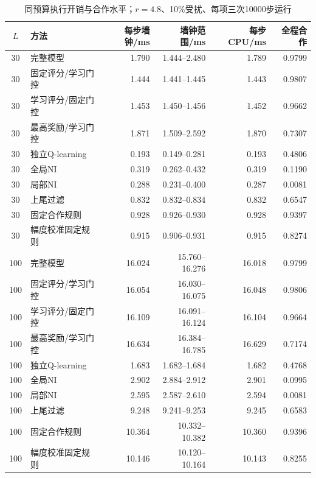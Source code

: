 \begin{table}[!htbp]
\centering\small
\caption{同预算执行开销与合作水平；$r=4.8$、10\%受扰、每项三次10000步运行}
\label{tab:w2-timing}
\begin{tabular}{clrrrr}
\toprule
$L$ & 方法 & 每步墙钟/ms & 墙钟范围/ms & 每步CPU/ms & 全程合作 \\
\midrule
30 & 完整模型 & 1.790 & 1.444--2.480 & 1.789 & 0.9799 \\
30 & 固定评分/学习门控 & 1.444 & 1.441--1.445 & 1.443 & 0.9807 \\
30 & 学习评分/固定门控 & 1.453 & 1.450--1.456 & 1.452 & 0.9662 \\
30 & 最高奖励/学习门控 & 1.871 & 1.509--2.592 & 1.870 & 0.7307 \\
30 & 独立Q-learning & 0.193 & 0.149--0.281 & 0.193 & 0.4806 \\
30 & 全局NI & 0.319 & 0.262--0.432 & 0.319 & 0.1190 \\
30 & 局部NI & 0.288 & 0.231--0.400 & 0.287 & 0.0081 \\
30 & 上尾过滤 & 0.832 & 0.832--0.834 & 0.832 & 0.6547 \\
30 & 固定合作规则 & 0.928 & 0.926--0.930 & 0.928 & 0.9397 \\
30 & 幅度校准固定规则 & 0.915 & 0.906--0.931 & 0.915 & 0.8274 \\
\midrule
100 & 完整模型 & 16.024 & 15.760--16.276 & 16.018 & 0.9799 \\
100 & 固定评分/学习门控 & 16.054 & 16.030--16.075 & 16.048 & 0.9806 \\
100 & 学习评分/固定门控 & 16.109 & 16.091--16.124 & 16.104 & 0.9664 \\
100 & 最高奖励/学习门控 & 16.634 & 16.384--16.785 & 16.629 & 0.7174 \\
100 & 独立Q-learning & 1.683 & 1.682--1.684 & 1.682 & 0.4768 \\
100 & 全局NI & 2.902 & 2.884--2.912 & 2.901 & 0.0995 \\
100 & 局部NI & 2.595 & 2.587--2.610 & 2.594 & 0.0081 \\
100 & 上尾过滤 & 9.248 & 9.241--9.253 & 9.245 & 0.6583 \\
100 & 固定合作规则 & 10.364 & 10.332--10.382 & 10.360 & 0.9396 \\
100 & 幅度校准固定规则 & 10.146 & 10.120--10.164 & 10.143 & 0.8255 \\
\bottomrule
\end{tabular}
\par{}
\end{table}
